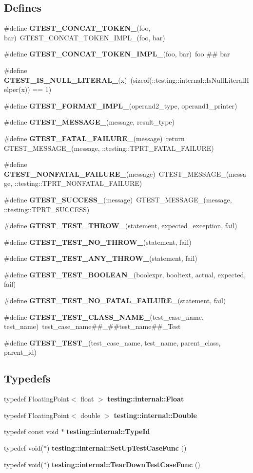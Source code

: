 \subsection*{Defines}
\begin{CompactItemize}
\item 
\#define {\bf GTEST\_\-CONCAT\_\-TOKEN\_\-}(foo, bar)~GTEST\_\-CONCAT\_\-TOKEN\_\-IMPL\_\-(foo, bar)
\item 
\#define {\bf GTEST\_\-CONCAT\_\-TOKEN\_\-IMPL\_\-}(foo, bar)~foo \#\# bar
\item 
\#define {\bf GTEST\_\-IS\_\-NULL\_\-LITERAL\_\-}(x)~(sizeof(::testing::internal::IsNullLiteralHelper(x)) == 1)
\item 
\#define {\bf GTEST\_\-FORMAT\_\-IMPL\_\-}(operand2\_\-type, operand1\_\-printer)
\item 
\#define {\bf GTEST\_\-MESSAGE\_\-}(message, result\_\-type)
\item 
\#define {\bf GTEST\_\-FATAL\_\-FAILURE\_\-}(message)~return GTEST\_\-MESSAGE\_\-(message, ::testing::TPRT\_\-FATAL\_\-FAILURE)
\item 
\#define {\bf GTEST\_\-NONFATAL\_\-FAILURE\_\-}(message)~GTEST\_\-MESSAGE\_\-(message, ::testing::TPRT\_\-NONFATAL\_\-FAILURE)
\item 
\#define {\bf GTEST\_\-SUCCESS\_\-}(message)~GTEST\_\-MESSAGE\_\-(message, ::testing::TPRT\_\-SUCCESS)
\item 
\#define {\bf GTEST\_\-TEST\_\-THROW\_\-}(statement, expected\_\-exception, fail)
\item 
\#define {\bf GTEST\_\-TEST\_\-NO\_\-THROW\_\-}(statement, fail)
\item 
\#define {\bf GTEST\_\-TEST\_\-ANY\_\-THROW\_\-}(statement, fail)
\item 
\#define {\bf GTEST\_\-TEST\_\-BOOLEAN\_\-}(boolexpr, booltext, actual, expected, fail)
\item 
\#define {\bf GTEST\_\-TEST\_\-NO\_\-FATAL\_\-FAILURE\_\-}(statement, fail)
\item 
\#define {\bf GTEST\_\-TEST\_\-CLASS\_\-NAME\_\-}(test\_\-case\_\-name, test\_\-name)~test\_\-case\_\-name\#\#\_\-\#\#test\_\-name\#\#\_\-Test
\item 
\#define {\bf GTEST\_\-TEST\_\-}(test\_\-case\_\-name, test\_\-name, parent\_\-class, parent\_\-id)
\end{CompactItemize}
\subsection*{Typedefs}
\begin{CompactItemize}
\item 
typedef FloatingPoint$<$ float $>$ {\bf testing::internal::Float}
\item 
typedef FloatingPoint$<$ double $>$ {\bf testing::internal::Double}
\item 
typedef const void $\ast$ {\bf testing::internal::TypeId}
\item 
typedef void($\ast$) {\bf testing::internal::SetUpTestCaseFunc} ()
\item 
typedef void($\ast$) {\bf testing::internal::TearDownTestCaseFunc} ()
\end{CompactItemize}
